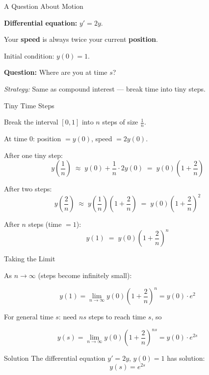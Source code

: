 \documentclass[10pt]{beamer}
\theoremstyle{definition}
\newcommand{\x}[1]{\alert{\textbf{#1}}}
\begin{document}
\begin{frame}{A Question About Motion}

\textbf{Differential equation:} $y' = 2y$.

\vfill

Your \x{speed} is always twice your current \x{position}.

\vfill

Initial condition: $y(0) = 1$.

\vfill\pause

\textbf{Question:} Where are you at time $s$?

\vfill

\textit{Strategy:} Same as compound interest --- break time into tiny steps.

\end{frame}


\begin{frame}{Tiny Time Steps}

Break the interval $[0,1]$ into $n$ steps of size $\frac{1}{n}$.

\vfill

At time $0$: position $= y(0)$, speed $= 2y(0)$.

\vfill

After one tiny step:
$$y\!\left(\frac{1}{n}\right) \;\approx\; y(0) + \frac{1}{n}\cdot 2y(0) \;=\; y(0)\left(1 + \frac{2}{n}\right)$$

\vfill\pause

After two steps:
$$y\!\left(\frac{2}{n}\right) \;\approx\; y\!\left(\frac{1}{n}\right)\!\left(1 + \frac{2}{n}\right) \;=\; y(0)\left(1 + \frac{2}{n}\right)^2$$

\vfill\pause

After $n$ steps (time $= 1$):
$$y(1) \;=\; y(0)\left(1+\frac{2}{n}\right)^n$$

\end{frame}


\begin{frame}{Taking the Limit}

As $n \to \infty$ (steps become infinitely small):

$$y(1) = \lim_{n\to\infty} y(0)\left(1+\frac{2}{n}\right)^n = y(0)\cdot e^2$$

\vfill\pause

For general time $s$: need $ns$ steps to reach time $s$, so

$$y(s) = \lim_{n\to\infty} y(0)\left(1+\frac{2}{n}\right)^{ns} = y(0)\cdot e^{2s}$$

\vfill\pause

\begin{block}{Solution}
The differential equation $y' = 2y$, \; $y(0) = 1$ has solution:
$$\boxed{y(s) = e^{2s}}$$
\end{block}

\end{frame}
\end{document}
